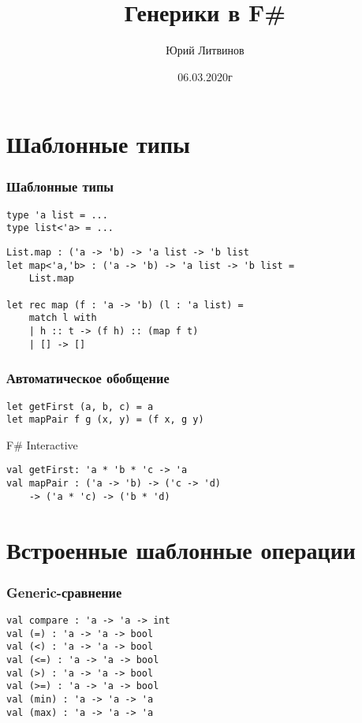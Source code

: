 \documentclass[xetex,mathserif,serif]{beamer}
\title{Генерики в F\#}
\author{Юрий Литвинов}
\date{06.03.2020г}
\begin{document}
	
	\frame{\titlepage}
	
	\section{Шаблонные типы}
	
	\begin{frame}[fragile]
		\frametitle{Шаблонные типы}
		\begin{verbatim}
type 'a list = ...
type list<'a> = ...
		\end{verbatim}

		\begin{verbatim}
List.map : ('a -> 'b) -> 'a list -> 'b list
let map<'a,'b> : ('a -> 'b) -> 'a list -> 'b list = 
    List.map

let rec map (f : 'a -> 'b) (l : 'a list) =
    match l with
    | h :: t -> (f h) :: (map f t)
    | [] -> []
		\end{verbatim}
	\end{frame}

	\begin{frame}[fragile]
		\frametitle{Автоматическое обобщение}
		\begin{verbatim}
let getFirst (a, b, c) = a
let mapPair f g (x, y) = (f x, g y)
		\end{verbatim}

		\begin{alertblock}{F\# Interactive}
			\begin{verbatim}
val getFirst: 'a * 'b * 'c -> 'a
val mapPair : ('a -> 'b) -> ('c -> 'd) 
    -> ('a * 'c) -> ('b * 'd)
			\end{verbatim}
		\end{alertblock}
	\end{frame}
	
	\section{Встроенные шаблонные операции}

	\begin{frame}[fragile]
		\frametitle{Generic-сравнение}
		\begin{verbatim}
val compare : 'a -> 'a -> int
val (=) : 'a -> 'a -> bool
val (<) : 'a -> 'a -> bool
val (<=) : 'a -> 'a -> bool
val (>) : 'a -> 'a -> bool
val (>=) : 'a -> 'a -> bool
val (min) : 'a -> 'a -> 'a
val (max) : 'a -> 'a -> 'a
		\end{verbatim}
	\end{frame}
\end{document}
